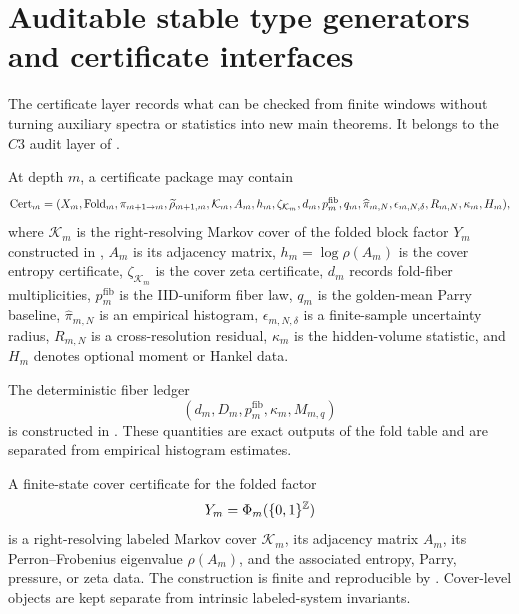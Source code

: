 \section{Auditable stable type generators and certificate interfaces}
\label{sec:certificates}

The certificate layer records what can be checked from finite windows without turning auxiliary spectra or statistics into new main theorems.  It belongs to the \(C3\) audit layer of .

\begin{definition}
\label{def:finite-certificate-package}
At depth \(m\), a certificate package may contain
\[
\operatorname{Cert}_m=(X_m,\operatorname{Fold}_m,\pi_{m+1\to m},\widetilde\rho_{m+1,m},\mathcal K_m,A_m,h_m,\zeta_{\mathcal K_m},d_m,p_m^{\mathrm{fib}},q_m,\widehat\pi_{m,N},\epsilon_{m,N,\delta},R_{m,N},\kappa_m,H_m),
\]
where \(\mathcal K_m\) is the right-resolving Markov cover of the folded block factor \(Y_m\) constructed in , \(A_m\) is its adjacency matrix, \(h_m=\log\rho(A_m)\) is the cover entropy certificate, \(\zeta_{\mathcal K_m}\) is the cover zeta certificate, \(d_m\) records fold-fiber multiplicities, \(p_m^{\mathrm{fib}}\) is the IID-uniform fiber law, \(q_m\) is the golden-mean Parry baseline, \(\widehat\pi_{m,N}\) is an empirical histogram, \(\epsilon_{m,N,\delta}\) is a finite-sample uncertainty radius, \(R_{m,N}\) is a cross-resolution residual, \(\kappa_m\) is the hidden-volume statistic, and \(H_m\) denotes optional moment or Hankel data.
\end{definition}

The deterministic fiber ledger
\[
(d_m,D_m,p_m^{\mathrm{fib}},\kappa_m,M_{m,q})
\]
is constructed in .  These quantities are exact outputs of the fold table and are separated from empirical histogram estimates.

\begin{definition}
\label{def:finite-graph-presentation}
A finite-state cover certificate for the folded factor
\[
Y_m=\Phi_m(\{0,1\}^{\mathbb{Z}})
\]
is a right-resolving labeled Markov cover \(\mathcal K_m\), its adjacency matrix \(A_m\), its Perron--Frobenius eigenvalue \(\rho(A_m)\), and the associated entropy, Parry, pressure, or zeta data.  The construction is finite and reproducible by .  Cover-level objects are kept separate from intrinsic labeled-system invariants.
\end{definition}

